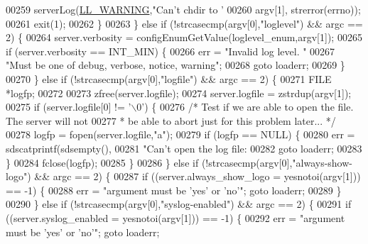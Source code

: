 \begin{DoxyCode}
00259                 serverLog(\hyperlink{server_8h_a31229b9334bba7d6be2a72970967a14b}{LL\_WARNING},\textcolor{stringliteral}{"Can't chdir to '%
00260                     argv[1], strerror(errno));
00261                 exit(1);
00262             \}
00263         \} \textcolor{keywordflow}{else} \textcolor{keywordflow}{if} (!strcasecmp(argv[0],\textcolor{stringliteral}{"loglevel"}) && argc == 2) \{
00264             server.verbosity = configEnumGetValue(loglevel\_enum,argv[1]);
00265             \textcolor{keywordflow}{if} (server.verbosity == INT\_MIN) \{
00266                 err = \textcolor{stringliteral}{"Invalid log level. "}
00267                       \textcolor{stringliteral}{"Must be one of debug, verbose, notice, warning"};
00268                 \textcolor{keywordflow}{goto} loaderr;
00269             \}
00270         \} \textcolor{keywordflow}{else} \textcolor{keywordflow}{if} (!strcasecmp(argv[0],\textcolor{stringliteral}{"logfile"}) && argc == 2) \{
00271             FILE *logfp;
00272 
00273             zfree(server.logfile);
00274             server.logfile = zstrdup(argv[1]);
00275             \textcolor{keywordflow}{if} (server.logfile[0] != \textcolor{stringliteral}{'\(\backslash\)0'}) \{
00276                 \textcolor{comment}{/* Test if we are able to open the file. The server will not}
00277 \textcolor{comment}{                 * be able to abort just for this problem later... */}
00278                 logfp = fopen(server.logfile,\textcolor{stringliteral}{"a"});
00279                 \textcolor{keywordflow}{if} (logfp == NULL) \{
00280                     err = sdscatprintf(sdsempty(),
00281                         \textcolor{stringliteral}{"Can't open the log file: %
00282                     \textcolor{keywordflow}{goto} loaderr;
00283                 \}
00284                 fclose(logfp);
00285             \}
00286         \} \textcolor{keywordflow}{else} \textcolor{keywordflow}{if} (!strcasecmp(argv[0],\textcolor{stringliteral}{"always-show-logo"}) && argc == 2) \{
00287             \textcolor{keywordflow}{if} ((server.always\_show\_logo = yesnotoi(argv[1])) == -1) \{
00288                 err = \textcolor{stringliteral}{"argument must be 'yes' or 'no'"}; \textcolor{keywordflow}{goto} loaderr;
00289             \}
00290         \} \textcolor{keywordflow}{else} \textcolor{keywordflow}{if} (!strcasecmp(argv[0],\textcolor{stringliteral}{"syslog-enabled"}) && argc == 2) \{
00291             \textcolor{keywordflow}{if} ((server.syslog\_enabled = yesnotoi(argv[1])) == -1) \{
00292                 err = \textcolor{stringliteral}{"argument must be 'yes' or 'no'"}; \textcolor{keywordflow}{goto} loaderr;
}}
\end{DoxyCode}
